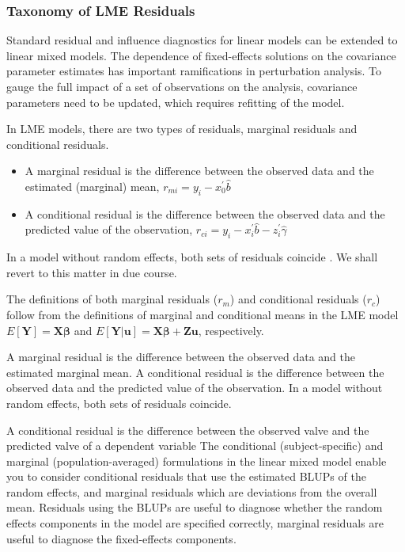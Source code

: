 \documentclass[12pt, a4paper]{report}
\theoremstyle{plain}
\theoremstyle{definition}
\theoremstyle{remark}
\begin{document}
	\subsubsection{Taxonomy of LME Residuals}
	Standard residual and influence diagnostics for linear models can
	be extended to linear mixed models. The dependence of
	fixed-effects solutions on the covariance parameter estimates has
	important ramifications in perturbation analysis. To gauge the
	full impact of a set of observations on the analysis, covariance
	parameters need to be updated, which requires refitting of the
	model.
	
	In LME models, there are two types of residuals, marginal residuals and conditional residuals. 
	
	\begin{itemize}
		\item A marginal residual is the difference between the observed data and the estimated (marginal) mean, $r_{mi} = y_i - x_0^{\prime} \hat{b}$
		\item A conditional residual is the difference between the observed data and the predicted value of the observation,
		$r_{ci} = y_i - x_i^{\prime} \hat{b} - z_i^{\prime} \hat{\gamma}$	
	\end{itemize} 
	In a model without random effects, both sets of
	residuals coincide \citep{schabenberger}. We shall revert to this matter in due course.
	
	The definitions of both marginal residuals ($r_m$) and conditional residuals ($r_c$) follow from the definitions of marginal and conditional means in the LME model 
	$E[\boldsymbol{Y}] = \boldsymbol{X}\boldsymbol{\beta}$ and $E[\boldsymbol{Y|\boldsymbol{u}}] = \boldsymbol{X}\boldsymbol{\beta} + \boldsymbol{Z}\boldsymbol{u}$, respectively.
	
	A marginal residual is the difference between the observed data and the estimated marginal mean. A conditional residual is the difference between the observed data and the predicted value of the observation. In a model without random effects, both sets of residuals coincide.
	
A conditional residual is the difference between the observed valve and the predicted valve of a dependent variable	
	The conditional (subject-specific) and marginal (population-averaged) formulations in the linear mixed model enable you to consider conditional residuals that use the estimated BLUPs of the random effects, and marginal residuals which are deviations from the overall mean. Residuals using the BLUPs are useful to diagnose whether the random effects components in the model are specified correctly, marginal residuals are useful to diagnose the fixed-effects components.	
	
\end{document}
